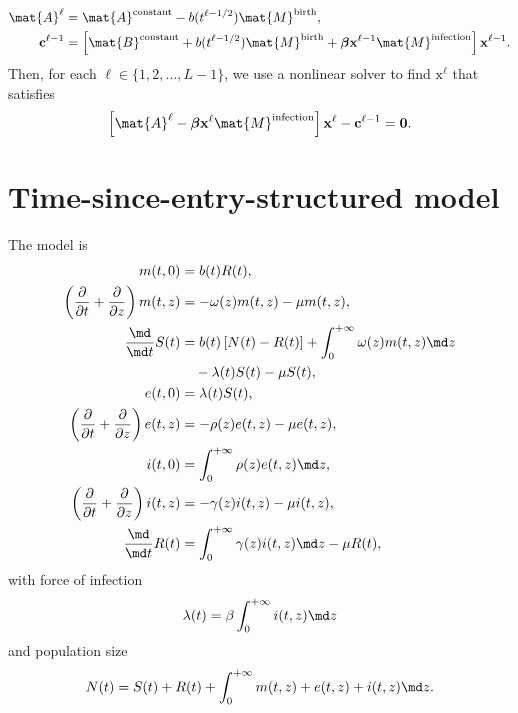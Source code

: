 \documentclass{jpmarticle}
\renewcommand{\vec}[1]{\boldsymbol{\mathrm{#1}}}
\begin{document}
\begin{equation}
  \begin{split}
    \mat{A}^{\ell} &=
    \mat{A}^{\text{constant}}
    - b(t^{\ell - 1 / 2}) \mat{M}^{\text{birth}},
    \\
    \vec{c}^{\ell - 1} &=
    \left[
      \mat{B}^{\text{constant}}
      + b(t^{\ell - 1 / 2}) \mat{M}^{\text{birth}}
      + \vec{\beta} \vec{x}^{\ell - 1} \mat{M}^{\text{infection}}
    \right] \vec{x}^{\ell - 1}.
  \end{split}
\end{equation}
Then, for each $\ell \in \{1, 2, \ldots, L - 1\}$,
we use a nonlinear solver to find $\vec{x}^{\ell}$ that satisfies
\begin{equation}
  \left[
    \mat{A}^{\ell}
    - \vec{\beta} \vec{x}^{\ell} \mat{M}^{\text{infection}}
  \right] \vec{x}^{\ell}
  - \vec{c}^{\ell - 1}
  = \vec{0}.
\end{equation}


\section{Time-since-entry-structured model}

The model is
\begin{equation}
  \label{model_time_since_entry_structured}
  \begin{split}
    m(t, 0) &=
    b(t) R(t),
    \\
    \left(\frac{\partial}{\partial t}
      + \frac{\partial}{\partial z}\right)
    m(t, z) &=
    - \omega(z) m(t, z) - \mu m(t, z),
    \\
    \frac{\md}{\md t} S(t) &=
    b(t) \left[N(t) - R(t)\right]
    + \int_0^{+\infty} \omega(z) m(t, z) \md z
    \\ & \quad {}
    - \lambda(t) S(t) - \mu S(t),
    \\
    e(t, 0) &=
    \lambda(t) S(t),
    \\
    \left(\frac{\partial}{\partial t}
      + \frac{\partial}{\partial z}\right)
    e(t, z) &=
    - \rho(z) e(t, z) - \mu e(t, z),
    \\
    i(t, 0) &=
    \int_0^{+\infty} \rho(z) e(t, z) \md z,
    \\
    \left(\frac{\partial}{\partial t}
      + \frac{\partial}{\partial z}\right)
    i(t, z) &=
    - \gamma(z) i(t, z) - \mu i(t, z),
    \\
    \frac{\md}{\md t} R(t) &=
    \int_0^{+\infty} \gamma(z) i(t, z) \md z
    - \mu R(t),
  \end{split}
\end{equation}
with force of infection
\begin{equation}
  \lambda(t) = \beta \int_0^{+\infty} i(t, z) \md z
\end{equation}
and population size
\begin{equation}
  N(t) =
  S(t) + R(t)
  + \int_0^{+\infty} m(t, z) + e(t, z) + i(t, z) \md z.
\end{equation}
\end{document}
